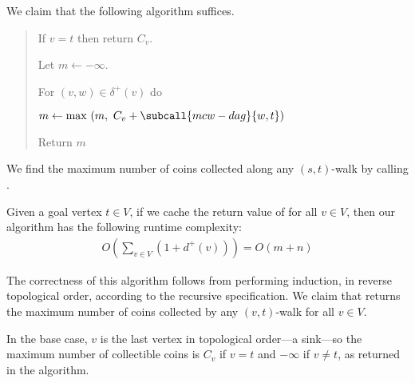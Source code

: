 \documentclass{article}
\begin{document}
\begin{solution}
We claim that the following algorithm suffices.

\begin{quote}%


\begin{steps}
    \item If \( v = t \) then return \( C_v \).
    \item Let \( m \leftarrow -\infty \).
    \item For \( (v,w)\in \delta^+(v) \) do
    \begin{steps}
        \item \( m \leftarrow \max \ (m, \ C_v + \subcall{mcw-dag}{w, t}) \)
    \end{steps}
  \item Return \( m \)
\end{steps}
\end{quote}

We find the maximum number of coins collected along any \( (s,t) \)-walk by calling .


\begin{subproof} [Runtime]
Given a goal vertex \( t \in V \), if we cache the return value of  for all \( v \in V \), then our algorithm has the following runtime complexity:
\begin{align*}
    O \left( \sum_{v\in V} ( 1 +  d^+(v) ) \right) = O \left( m+n \right)
\end{align*}
\vspace{-0.5cc}
\end{subproof}

\vspace{-0.5cc}
\begin{subproof} [Correctness]
The correctness of this algorithm follows from performing induction, in reverse topological order, according to the recursive specification. We claim that  returns the maximum number of coins collected by any \( (v,t) \)-walk for all \( v \in V \).

In the base case, \( v \) is the last vertex in topological order---a sink---so the maximum number of collectible coins is \( C_v \) if \( v=t \) and \( -\infty \) if \( v \not= t \), as returned in the algorithm.


\end{subproof}
\end{solution}
\end{document}
